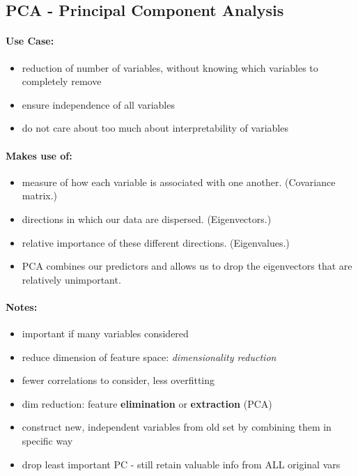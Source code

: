 \subsection{PCA - Principal Component Analysis}

\paragraph{Use Case:}

\begin{itemize}
  \item reduction of number of variables, without knowing which variables to completely remove
  \item ensure independence of all variables
  \item do not care about too much about interpretability of variables
\end{itemize}

\paragraph{Makes use of:}
\begin{itemize}
  \item measure of how each variable is associated with one another. (Covariance matrix.)
  \item directions in which our data are dispersed. (Eigenvectors.)
  \item relative importance of these different directions. (Eigenvalues.)
  \item PCA combines our predictors and allows us to drop the eigenvectors that are relatively unimportant.
\end{itemize}


\paragraph{Notes:}
\begin{itemize}
  \item important if many variables considered
  \item reduce dimension of feature space: \emph{dimensionality reduction}
  \item fewer correlations to consider, less overfitting
  \item dim reduction: feature \textbf{elimination} or \textbf{extraction} (PCA)
  \item construct new, independent variables from old set by combining them in specific way
  \item drop least important PC - still retain valuable info from ALL original vars
\end{itemize}


